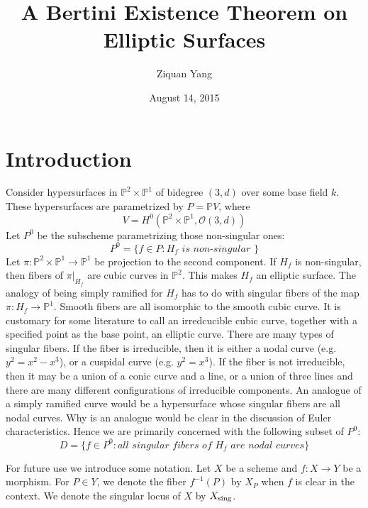 \documentclass[12pt]{article}
\theoremstyle{plain}
\theoremstyle{definition}
\newcommand{\IP}{\mathbb{P}}
\newcommand{\sO}{\mathcal{O}}
\newcommand{\sing}{{\rm sing}}
\newcommand{\<}{\langle}
\renewcommand{\>}{\rangle}
\begin{document}
%

\title{A Bertini Existence Theorem on Elliptic Surfaces}
\author{Ziquan Yang}


\date{August 14, 2015}

\maketitle
 

\setcounter{section}{0}

\section{Introduction}
Consider hypersurfaces in $\IP^2 \times \IP^1$ of bidegree $(3, d)$ over some base field $k$. These hypersurfaces are parametrized by $P = \IP V$, where
$$ V = H^0 ( \IP^2 \times \IP^1, \sO(3, d) ) $$
Let $P^0$ be the subscheme parametrizing those non-singular ones:
$$ P^0 = \{ f \in P : H_f \textit{ is non-singular }\} $$
Let $\pi : \IP^2 \times \IP^1 \to \IP^1$ be projection to the second component. If $H_f$ is non-singular, then fibers of $\pi|_{H_f}$ are cubic curves in $\IP^2$. This makes $H_f$ an elliptic surface. The analogy of being simply ramified for $H_f$ has to do with singular fibers of the map $\pi : H_f \to \IP^1$. Smooth fibers are all isomorphic to the smooth cubic curve. It is customary for some literature to call an irredcucible cubic curve, together with a specified point as the base point, an elliptic curve. There are many types of singular fibers. If the fiber is irreducible, then it is either a nodal curve (e.g. $y^2 = x^2 - x^3$), or a cuspidal curve (e.g. $y^2 = x^3$). If the fiber is not irreducible, then it may be a union of a conic curve and a line, or a union of three lines and there are many different configurations of irreducible components. 
An analogue of a simply ramified curve would be a hypersurface whose singular fibers are all nodal curves. Why is an analogue would be clear in the discussion of Euler characteristics. Hence we are primarily concerned with the following subset of $P^0$: 
$$ D = \{ f \in P^0 : \textit{all singular fibers of $H_f$ are nodal curves} \}$$

For future use we introduce some notation. Let $X$ be a scheme and $f : X \to Y$ be a morphism. For $P \in Y$, we denote the fiber $f^{-1}(P)$ by $X_P$ when $f$ is clear in the context. We denote the singular locus of $X$ by $X_\sing$. 
\end{document}
